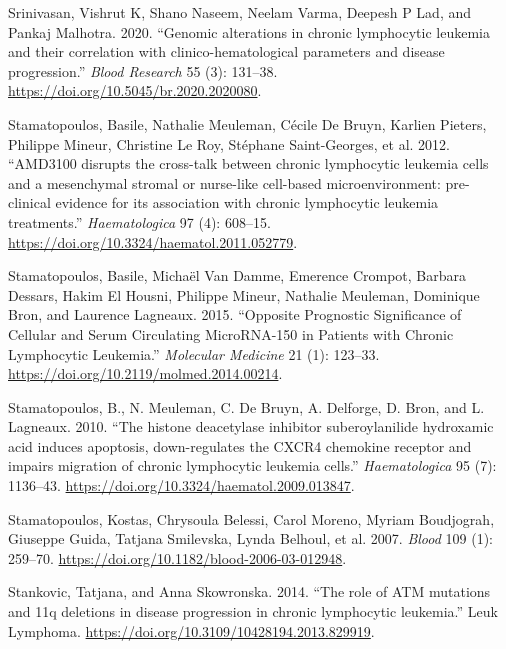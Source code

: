 \documentclass[11pt, a4paper, twosided]{book}
\newenvironment{CSLReferences}%
  {}%
  {\par}
\begin{document}
\begin{CSLReferences}{1}{0}
\leavevmode{}%
Srinivasan, Vishrut K, Shano Naseem, Neelam Varma, Deepesh P Lad, and Pankaj Malhotra. 2020. {``{Genomic alterations in chronic lymphocytic leukemia and their correlation with clinico-hematological parameters and disease progression}.''} \emph{Blood Research} 55 (3): 131--38. \url{https://doi.org/10.5045/br.2020.2020080}.

\leavevmode{}%
Stamatopoulos, Basile, Nathalie Meuleman, Cécile De Bruyn, Karlien Pieters, Philippe Mineur, Christine Le Roy, Stéphane Saint-Georges, et al. 2012. {``{AMD3100 disrupts the cross-talk between chronic lymphocytic leukemia cells and a mesenchymal stromal or nurse-like cell-based microenvironment: pre-clinical evidence for its association with chronic lymphocytic leukemia treatments.}''} \emph{Haematologica} 97 (4): 608--15. \url{https://doi.org/10.3324/haematol.2011.052779}.

\leavevmode{}%
Stamatopoulos, Basile, Michaël Van Damme, Emerence Crompot, Barbara Dessars, Hakim El Housni, Philippe Mineur, Nathalie Meuleman, Dominique Bron, and Laurence Lagneaux. 2015. {``{Opposite Prognostic Significance of Cellular and Serum Circulating MicroRNA-150 in Patients with Chronic Lymphocytic Leukemia}.''} \emph{Molecular Medicine} 21 (1): 123--33. \url{https://doi.org/10.2119/molmed.2014.00214}.

\leavevmode{}%
Stamatopoulos, B., N. Meuleman, C. De Bruyn, A. Delforge, D. Bron, and L. Lagneaux. 2010. {``{The histone deacetylase inhibitor suberoylanilide hydroxamic acid induces apoptosis, down-regulates the CXCR4 chemokine receptor and impairs migration of chronic lymphocytic leukemia cells}.''} \emph{Haematologica} 95 (7): 1136--43. \url{https://doi.org/10.3324/haematol.2009.013847}.

\leavevmode{}%
Stamatopoulos, Kostas, Chrysoula Belessi, Carol Moreno, Myriam Boudjograh, Giuseppe Guida, Tatjana Smilevska, Lynda Belhoul, et al. 2007. \emph{Blood} 109 (1): 259--70. \url{https://doi.org/10.1182/blood-2006-03-012948}.

\leavevmode{}%
Stankovic, Tatjana, and Anna Skowronska. 2014. {``{The role of ATM mutations and 11q deletions in disease progression in chronic lymphocytic leukemia}.''} Leuk Lymphoma. \url{https://doi.org/10.3109/10428194.2013.829919}.


\end{CSLReferences}
\end{document}
